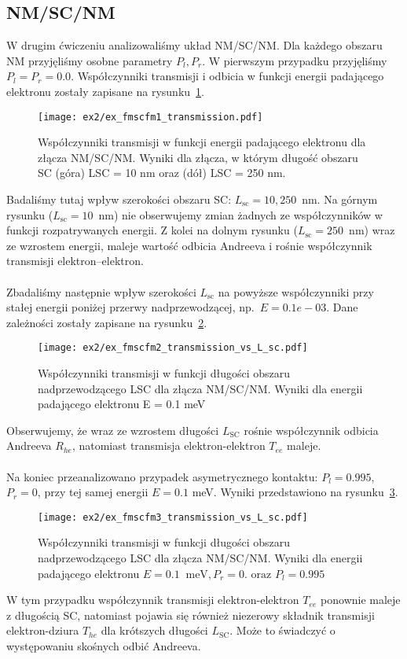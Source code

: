 \documentclass{article}
\begin{document}
\subsection{NM/SC/NM}
W drugim ćwiczeniu analizowaliśmy układ NM/SC/NM.
Dla każdego obszaru NM przyjęliśmy osobne parametry $P_l, P_r$.
W pierwszym przypadku przyjęliśmy $P_l=P_r=0.0$.
Współczynniki transmisji i odbicia w funkcji energii padającego elektronu zostały zapisane na rysunku~\ref{fig:ex2-transmission}.
\begin{figure}[htp!]
    \centering
    \texttt{[image: ex2/ex\_fmscfm1\_transmission.pdf]}
    \caption{ Współczynniki transmisji w funkcji energii padającego elektronu dla złącza NM/SC/NM. Wyniki
dla złącza, w którym długość obszaru SC (góra) LSC = 10 nm oraz (dół) LSC = 250 nm.}
    \label{fig:ex2-transmission}
\end{figure}
Badaliśmy tutaj wpływ szerokości obszaru SC: $L_{\text{sc}}=10, 250$~nm.
Na górnym rysunku ($L_{\text{sc}}=10$~nm) nie obserwujemy zmian żadnych ze współczynników w funkcji rozpatrywanych energii.
Z kolei na dolnym rysunku ($L_{\text{sc}}=250$~nm) wraz ze wzrostem energii, maleje wartość odbicia Andreeva i rośnie współczynnik transmisji elektron--elektron.\\
\\
Zbadaliśmy następnie wpływ szerokości $L_{\text{sc}}$ na powyższe współczynniki przy stałej energii poniżej przerwy nadprzewodzącej, np.~$E = 0.1e-03$.
Dane zależności zostały zapisane na rysunku~\ref{fig:ex2-wspolczynniki-lsc}.
\begin{figure}[htp!]
    \centering
    \texttt{[image: ex2/ex\_fmscfm2\_transmission\_vs\_L\_sc.pdf]}
    \caption{Współczynniki transmisji w funkcji długości obszaru nadprzewodzącego LSC dla złącza NM/SC/NM.
Wyniki dla energii padającego elektronu E = 0.1 meV}
    \label{fig:ex2-wspolczynniki-lsc}
\end{figure}
Obserwujemy, że wraz ze wzrostem długości $L_{\text{SC}}$ rośnie współczynnik odbicia Andreeva $R_{he}$, natomiast transmisja elektron-elektron $T_{ee}$ maleje.\\
\\
Na koniec przeanalizowano przypadek asymetrycznego kontaktu: $P_l = 0.995$, $P_r = 0$, przy tej samej energii $E = 0.1$ meV. 
Wyniki przedstawiono na rysunku~\ref{fig:ex2-transmission-pl}.
\begin{figure}[htp!]
    \centering
    \texttt{[image: ex2/ex\_fmscfm3\_transmission\_vs\_L\_sc.pdf]}
    \caption{Współczynniki transmisji w funkcji długości obszaru nadprzewodzącego LSC dla złącza NM/SC/NM.
Wyniki dla energii padającego elektronu $E = 0.1~\text{ meV}, P_r = 0. \text{ oraz }  P_l = 0.995$}
    \label{fig:ex2-transmission-pl}
\end{figure}
W tym przypadku współczynnik transmisji elektron-elektron $T_{ee}$ ponownie maleje z długością SC, natomiast pojawia się również niezerowy składnik transmisji elektron-dziura $T_{he}$ dla krótszych długości $L_{\text{SC}}$. 
Może to świadczyć o występowaniu skośnych odbić Andreeva.
\end{document}
